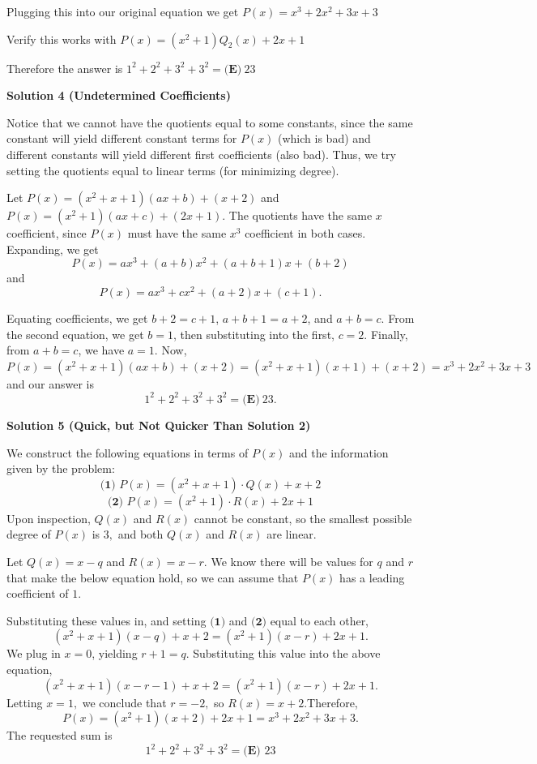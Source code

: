 \begin{enumerate}
 Plugging this into our original equation we get $P(x) = x^3 + 2x^2 + 3x + 3$

 Verify this works with $P(x) = (x^2+1)Q_2(x) + 2x + 1$

 Therefore the answer is $1^2 + 2^2 + 3^2 + 3^2 = \boxed{\textbf{(E)} \ 23}$




\textbf{Solution 4 (Undetermined Coefficients)}

Notice that we cannot have the quotients equal to some constants, since the same constant will yield different constant terms for $P(x)$ (which is bad) and different constants will yield different first coefficients (also bad). Thus, we try setting the quotients equal to linear terms (for minimizing degree).

 Let $P(x)=(x^2+x+1)(ax+b)+(x+2)$ and $P(x)=(x^2+1)(ax+c)+(2x+1)$. The quotients have the same $x$ coefficient, since $P(x)$ must have the same $x^3$ coefficient in both cases. Expanding, we get 
 \[P(x)=ax^3+(a+b)x^2+(a+b+1)x+(b+2)\] and 
 \[P(x)=ax^3+cx^2+(a+2)x+(c+1).\]

 Equating coefficients, we get $b+2=c+1$, $a+b+1=a+2$, and $a+b=c$. From the second equation, we get $b=1$, then substituting into         the first, $c=2$. Finally, from $a+b=c$, we have $a=1$. Now, $P(x)=(x^2+x+1)(ax+b)+(x+2)=(x^2+x+1)(x+1)+(x+2)=x^3+2x^2+3x+3$ and our answer is 
 \[1^2+2^2+3^2+3^2=\boxed{\textbf{(E)} \ 23}.\]




\textbf{Solution 5 (Quick, but Not Quicker Than Solution 2)}

We construct the following equations in terms of $P(x)$ and the information given by the problem:
 \[\textbf{(1) } P(x)=(x^2+x+1)\cdot Q(x)+x+2\]
 \[\textbf{(2) } P(x)=(x^2+1)\cdot R(x)+2x+1\]Upon inspection, $Q(x)$ and $R(x)$ cannot be constant, so the smallest possible degree of $P(x)$ is $3,$ and both $Q(x)$ and $R(x)$ are linear. 

 Let $Q(x)=x-q$ and $R(x)=x-r.$ We know there will be values for $q$ and $r$ that make the below equation hold, so we can assume that $P(x)$ has a leading coefficient of $1$.

 Substituting these values in, and setting $\textbf{(1)}$ and $\textbf{(2)}$ equal to each  other,
 \[(x^2+x+1)(x-q)+x+2=(x^2+1)(x-r)+2x+1.\]We plug in $x=0$, yielding $r+1=q.$ Substituting this value into the above equation, 
 \[(x^2+x+1)(x-r-1)+x+2=(x^2+1)(x-r)+2x+1.\]Letting $x=1,$ we conclude that $r=-2,$ so $R(x)=x+2.$Therefore, 
 \[P(x)=(x^2+1)(x+2)+2x+1 = x^3+2x^2+3x+3.\]The requested sum is 
 \[1^2+2^2+3^2+3^2=\boxed{\textbf{(E) }23}\]


\end{enumerate}
